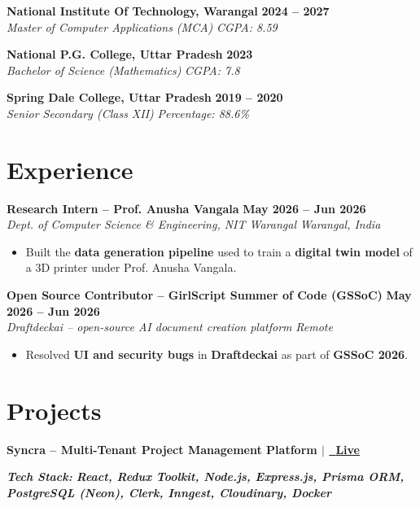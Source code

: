 \documentclass[10pt,a4paper]{article}
\newcommand{\resumeItem}[1]{
    \item \textrelsize{+0.5} #1
}
\newcommand{\resumeSubheading}[4]{
    \vspace{1pt}
    \textbf{#1} \hfill \textbf{#2}\\
    \textit{\small #3} \hfill \textit{\small #4}
    \vspace{1pt}
}
\begin{document}
\resumeSubheading
{National Institute Of Technology, Warangal}
{2024 -- 2027}
{Master of Computer Applications (MCA)}
{CGPA: 8.59}

\resumeSubheading
{National P.G. College, Uttar Pradesh}
{2023}
{Bachelor of Science (Mathematics)}
{CGPA: 7.8}

\resumeSubheading
{Spring Dale College, Uttar Pradesh}
{2019 -- 2020}
{Senior Secondary (Class XII)}
{Percentage: 88.6\%}


\section{Experience}

\resumeSubheading
{Research Intern -- Prof. Anusha Vangala}
{May 2026 -- Jun 2026}
{Dept. of Computer Science \& Engineering, NIT Warangal}
{Warangal, India}

\begin{itemize}
    \resumeItem{Built the \textbf{data generation pipeline} used to train a \textbf{digital twin model} of a 3D printer under Prof. Anusha Vangala.}
\end{itemize}

\resumeSubheading
{Open Source Contributor -- GirlScript Summer of Code (GSSoC)}
{May 2026 -- Jun 2026}
{Draftdeckai -- open-source AI document creation platform}
{Remote}

\begin{itemize}
    \resumeItem{Resolved \textbf{UI and security bugs} in \textbf{Draftdeckai} as part of \textbf{GSSoC 2026}.}
\end{itemize}


\section{Projects}


\resumeSubheading
{Syncra -- Multi-Tenant Project Management Platform \normalfont\small $|$ \href{https://syncra-workflow.vercel.app/}{\faExternalLink\ \textbf{Live}}}
{}
{}
{}

\vspace{-4pt}
{\small
\textit{\textbf{Tech Stack:}
\textbf{React, Redux Toolkit, Node.js, Express.js, Prisma ORM, PostgreSQL (Neon), Clerk, Inngest, Cloudinary, Docker}}
}
\end{document}
